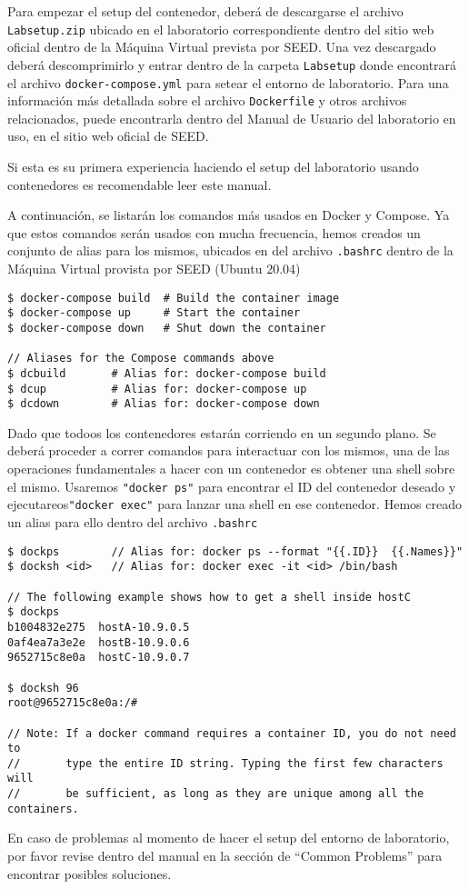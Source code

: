 Para empezar el setup del contenedor, deberá de descargarse el archivo \texttt{Labsetup.zip} ubicado en el laboratorio correspondiente dentro del sitio web oficial dentro de la Máquina Virtual prevista por SEED. Una vez descargado deberá descomprimirlo y entrar dentro de la carpeta \texttt{Labsetup} donde encontrará el archivo \texttt{docker-compose.yml} para setear el entorno de laboratorio. Para una información más detallada sobre el archivo \texttt{Dockerfile} y otros archivos relacionados, puede encontrarla dentro del Manual de Usuario del laboratorio en uso, en el sitio web oficial de SEED.

Si esta es su primera experiencia haciendo el setup del laboratorio usando contenedores es recomendable leer este manual.

A continuación, se listarán los comandos más usados en Docker y Compose.
Ya que estos comandos serán usados con mucha frecuencia, hemos creados un conjunto de alias para los mismos, ubicados en del archivo \texttt{.bashrc} dentro de la Máquina Virtual provista por SEED (Ubuntu 20.04)

\begin{lstlisting}
$ docker-compose build  # Build the container image
$ docker-compose up     # Start the container
$ docker-compose down   # Shut down the container

// Aliases for the Compose commands above
$ dcbuild       # Alias for: docker-compose build
$ dcup          # Alias for: docker-compose up
$ dcdown        # Alias for: docker-compose down
\end{lstlisting}


Dado que todoos los contenedores estarán corriendo en un segundo plano. Se deberá proceder a correr comandos para interactuar con los mismos, una de las operaciones fundamentales a hacer con un contenedor es obtener una shell sobre el mismo. Usaremos \texttt{"docker ps"} para encontrar el ID del contenedor deseado y ejecutareos\texttt{"docker exec"} para lanzar una shell en ese contenedor.
Hemos creado un alias para ello dentro del archivo \texttt{.bashrc}

\begin{lstlisting}
$ dockps        // Alias for: docker ps --format "{{.ID}}  {{.Names}}" 
$ docksh <id>   // Alias for: docker exec -it <id> /bin/bash

// The following example shows how to get a shell inside hostC
$ dockps
b1004832e275  hostA-10.9.0.5
0af4ea7a3e2e  hostB-10.9.0.6
9652715c8e0a  hostC-10.9.0.7

$ docksh 96
root@9652715c8e0a:/#  

// Note: If a docker command requires a container ID, you do not need to 
//       type the entire ID string. Typing the first few characters will 
//       be sufficient, as long as they are unique among all the containers. 
\end{lstlisting}

En caso de problemas al momento de hacer el setup del entorno de laboratorio, por favor revise dentro del manual en la sección de ``Common Problems'' para encontrar posibles soluciones.

